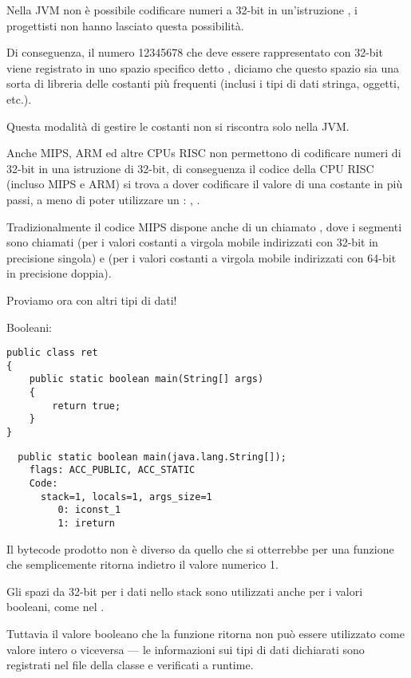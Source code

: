 Nella JVM non è possibile codificare numeri a 32-bit in un'istruzione , 
i progettisti non hanno lasciato questa possibilità.

Di conseguenza, il numero 12345678 che deve essere rappresentato con 32-bit viene registrato in uno spazio specifico detto
, diciamo che questo spazio sia una sorta di libreria delle costanti più frequenti 
(inclusi i tipi di dati stringa, oggetti, etc.).

Questa modalità di gestire le costanti non si riscontra solo nella JVM.

Anche MIPS, ARM ed altre CPUs RISC non permettono di codificare numeri di 32-bit
in una istruzione  di 32-bit, di conseguenza il codice della CPU RISC (incluso MIPS e ARM)
si trova a dover codificare il valore di una costante in più passi, a meno di poter utilizzare un
: , .

Tradizionalmente il codice MIPS dispone anche di un  chiamato ,
dove i segmenti sono chiamati  (per i valori costanti a virgola mobile indirizzati con 32-bit in precisione singola) e 
(per i valori costanti a virgola mobile indirizzati con 64-bit in precisione doppia).

Proviamo ora con altri tipi di dati!

Booleani:

\begin{lstlisting}[style=customjava]
public class ret
{
	public static boolean main(String[] args)
	{
		return true;
	}
}
\end{lstlisting}

\begin{lstlisting}
  public static boolean main(java.lang.String[]);
    flags: ACC_PUBLIC, ACC_STATIC
    Code:
      stack=1, locals=1, args_size=1
         0: iconst_1
         1: ireturn
\end{lstlisting}

Il bytecode prodotto non è diverso da quello che si otterrebbe per una funzione che semplicemente ritorna indietro il valore numerico 1.

Gli spazi da 32-bit per i dati nello stack sono utilizzati anche per i valori booleani, come nel \CCpp.

Tuttavia il valore booleano che la funzione ritorna non può essere utilizzato come valore intero o viceversa --- 
le informazioni sui tipi di dati dichiarati sono registrati nel file della classe e verificati a runtime.

